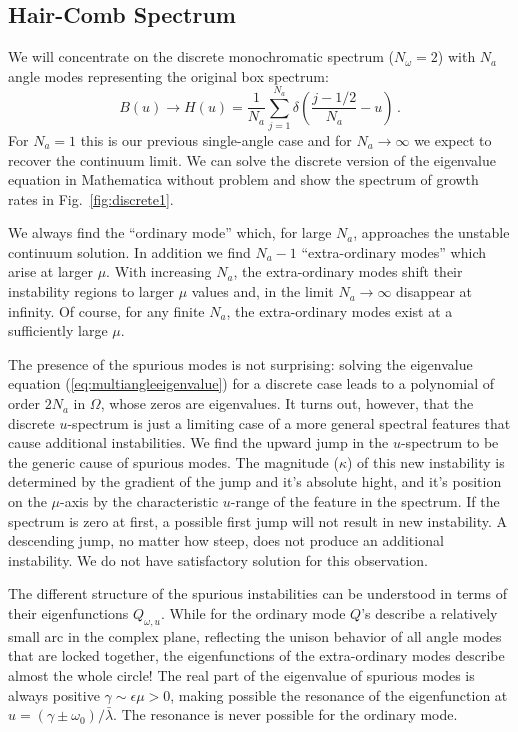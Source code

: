 \documentclass[twocolumn,prd,showpacs,
floatfix,preprintnumbers,nofootinbib]{revtex4}
\begin{document}
\subsection{Hair-Comb Spectrum}

We will concentrate on the discrete monochromatic spectrum ($N_\omega=2$) with $N_a$ angle modes representing the original box spectrum:
\begin{equation}
B(u)\to H(u)=\frac{1}{N_a}
\sum_{j=1}^{N_a}\delta\left(\frac{j-1/2}{N_a}-u\right)\,.
\end{equation}
For $N_a=1$ this is our previous single-angle case and for
$N_a\to\infty$ we expect to recover the continuum limit. We can
solve the discrete version of the eigenvalue equation in Mathematica
without problem and show the spectrum of growth rates in
Fig.~\ref{fig:discrete1}.


We always find the ``ordinary mode'' which, for large $N_a$, 
approaches the unstable continuum solution. In addition we find
$N_a-1$ ``extra-ordinary modes'' which arise at larger $\mu$. With
increasing $N_a$, the extra-ordinary modes shift their instability
regions to larger $\mu$ values and, in the limit $N_a\to\infty$
disappear at infinity. Of course, for any finite $N_a$, the
extra-ordinary modes exist at a sufficiently large $\mu$.

The presence of the spurious modes is not surprising: solving the eigenvalue equation (\ref{eq:multiangleeigenvalue}) for a discrete case leads to a polynomial of order $2 N_a$ in $\Omega$, whose zeros are eigenvalues. 
It turns out, however, that the discrete $u$-spectrum is just a limiting case of a more general spectral features that cause additional instabilities. We find the upward jump in the $u$-spectrum to be the generic cause of spurious modes. The magnitude ($\kappa$) of this new instability is determined by the gradient of the jump and it's absolute hight, and it's position on the $\mu$-axis by the characteristic $u$-range of the feature in the spectrum.
If the spectrum is zero at first, a possible first jump will not result in new instability.
A descending jump, no matter how steep, does not produce an additional instability. We do not have satisfactory solution for this observation. 


The different structure of the spurious instabilities can be understood in terms of their eigenfunctions $Q_{\omega,u}$. While for the ordinary mode $Q$'s describe a relatively small arc in the complex plane, reflecting the unison behavior of all angle modes that are locked together, the eigenfunctions of the extra-ordinary modes
describe almost the whole circle! The real part of the eigenvalue of spurious modes is always positive $\gamma\sim \epsilon \mu >0$, making possible the resonance of the eigenfunction at $u=(\gamma \pm \omega_0)/\bar\lambda$. The resonance is never possible for the ordinary mode.
\end{document}
